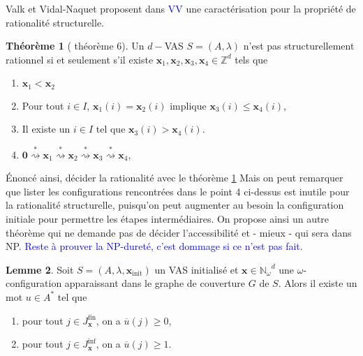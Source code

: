 \documentclass[a4paper,final]{article}
\theoremstyle{definition}
\newtheorem{Theorem}{Théorème}
\newtheorem{Lemma}[Theorem]{Lemme}
\let\leq\leqslant
\let\geq\geqslant
\newcommand{\alain}[1]{\textcolor{blue}{#1}}
\newcommand{\Z}{\ensuremath{\mathbb{Z}}}
\newcommand{\Nomega}{\ensuremath{\mathbb{N}_\omega}}
\newcommand{\transZ}[1]{\ensuremath{\stackrel{#1}{\rightsquigarrow}}}
\newcommand{\vect}[1]{\ensuremath{\mathbf{#1}}}
\newcommand{\xinit}{\ensuremath{\vect{x}_\text{init}}}
\newcommand{\valeur}[1]{\ensuremath{\overline{#1}}}
\newcommand{\Jfin}[1]{J^\text{fin}_{#1}}
\newcommand{\Jinf}[1]{J^\text{inf}_{#1}}
\begin{document}
Valk et Vidal-Naquet proposent dans \cite{vavn81} \alain{VV} une caractérisation pour la propriété de rationalité structurelle.

\begin{Theorem}[\cite{vavn81} théorème 6]
\label{rat_struct_valk}
Un $d-$VAS $S=(A,\lambda)$ n'est pas structurellement rationnel si et seulement s'il existe $\vect{x}_1, \vect{x}_2, \vect{x}_3, \vect{x}_4 \in \Z^d$ tels que 
\begin{enumerate}
    \item $\vect{x}_1 < \vect{x}_2$
    \item Pour tout $i \in I$, $\vect{x}_1(i) = \vect{x}_2(i)$ implique $\vect{x}_3(i) \leq \vect{x}_4(i)$,
    \item Il existe un $i\in I$ tel que $\vect{x}_3(i) > \vect{x}_4(i)$.
    
    \item $\vect{0} \transZ{*} \vect{x}_1 \transZ{*} \vect{x}_2 \transZ{*} \vect{x}_3 \transZ{*} \vect{x}_4$,
\end{enumerate}
\end{Theorem}


Énoncé ainsi, décider la rationalité avec le théorème \ref{rat_struct_valk} 
Mais on peut remarquer que lister les configurations rencontrées dans le point 4 ci-dessus est inutile pour la rationalité structurelle, puisqu'on peut augmenter au besoin la configuration initiale  pour permettre les étapes intermédiaires.
On propose ainsi un autre théorème qui ne demande pas de décider l'accessibilité et - mieux - qui sera dans NP.
\alain{Reste à prouver la NP-dureté, c'est dommage si ce n'est pas fait.}


\begin{Lemma}\label{lem_access_generator}
    Soit $S=(A,\lambda,\xinit)$ un VAS initialisé et $\vect{x}\in\Nomega^d$ une $\omega$-configuration apparaissant dans le graphe de couverture $G$ de $S$.
    Alors il existe un mot $u\in A^*$ tel que
    \begin{enumerate}
        \item pour tout $j\in\Jfin{\vect{x}}$, on a $\valeur{u}(j) \geq 0$,
        \item pour tout $j\in\Jinf{\vect{x}}$, on a $\valeur{u}(j) \geq 1$.
    \end{enumerate}
\end{Lemma}
\end{document}

